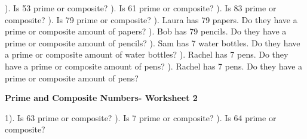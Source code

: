\documentclass{article}%
\begin{document}
). Is 53 prime or composite?%
\newline%
\newline%
). Is 61 prime or composite?%
\newline%
\newline%
). Is 83 prime or composite?%
\newline%
\newline%
). Is 79 prime or composite?%
\newline%
\newline%
). Laura has 79 papers. Do they have a prime or composite amount of papers?%
\newline%
\newline%
). Bob has 79 pencils. Do they have a prime or composite amount of pencils?%
\newline%
\newline%
). Sam has 7 water bottles. Do they have a prime or composite amount of water bottles?%
\newline%
\newline%
). Rachel has 7 pens. Do they have a prime or composite amount of pens?%
\newline%
\newline%
). Rachel has 7 pens. Do they have a prime or composite amount of pens?%
\newline%
\newline%
\newline%
\pagebreak%
\large%
\begin{center}%
\textbf{Prime and Composite Numbers- Worksheet 2}%
\newline%
\end{center} \normalsize%
1). Is 63 prime or composite?%
\newline%
\newline%
). Is 7 prime or composite?%
\newline%
\newline%
). Is 64 prime or composite?%
\newline%
\end{document}
